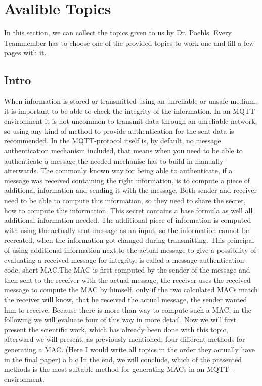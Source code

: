 \section{Avalible Topics}
In this section, we can collect the topics given to us by Dr. Poehls. Every Teammember has to choose one of the provided topics to work one and fill a few pages with it.

\subsection{Intro}
When information is stored or transmitted using an unreliable or unsafe medium, it is important to be able to check the integrity of the information. In an MQTT-environment it is not uncommon to transmit data through an unreliable network, so using any kind of method to provide authentication for the sent data is recommended. In the MQTT-protocol itself is, by default, no message authentication mechanism included, that means when you need to be able to authenticate a message the needed mechanise has to build in manually afterwards. The commonly known way for being able to authenticate, if a message was received containing the right information, is to compute a piece of additional information and sending it with the message. Both sender and receiver need to be able to compute this information, so they need to share the secret, how to compute this information. This secret contains a base formula as well all additional information needed. The additional piece of information is computed with using the actually sent message as an input, so the information cannot be recreated, when the information got changed during transmitting. This principal of using additional information next to the actual message to give a possibility of evaluating a received message for integrity, is called a message authentication code, short MAC.The MAC is first computed by the sender of the message and then sent to the receiver with the actual message, the receiver uses the received message to compute the MAC by himself, only if the two calculated MACs match the receiver will know, that  he received the actual message, the sender wanted him to receive. Because there is more than way to compute such a MAC, in the following we will evaluate four of this way in more detail. Now we will first present the scientific work, which has already been done with this topic, afterward we will present, as previously mentioned, four different methods for generating a MAC. 
\newline
(Here I would write all topics in the order they actually have in the final paper)
\newline
a
\newline
b
\newline
c
\newline
In the end, we will conclude, which of the presented methods is the most suitable method for generating MACs in an MQTT- environment.
